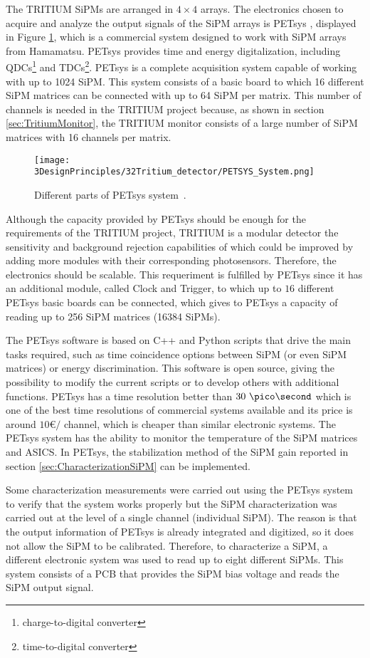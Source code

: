 The TRITIUM SiPMs are arranged in $4\times 4$ arrays. The electronics chosen to acquire and analyze the output signals of the SiPM arrays is PETsys \cite{PETSYS}, displayed in Figure \ref{fig:PETSYS}, which is a commercial system designed to work with SiPM arrays from Hamamatsu. PETsys provides time and energy digitalization, including QDCs\footnote{charge-to-digital converter} and TDCs\footnote{time-to-digital converter}. PETsys is a complete acquisition system capable of working with up to 1024 SiPM. This system consists of a basic board to which 16 different SiPM matrices can be connected with up to 64 SiPM per matrix. This number of channels is needed in the TRITIUM project because, as shown in section \ref{sec:TritiumMonitor}, the TRITIUM monitor consists of a large number of SiPM matrices with 16 channels per matrix.

\begin{figure}[h]
\centering
\texttt{[image: 3DesignPrinciples/32Tritium\_detector/PETSYS\_System.png]}
\caption{Different parts of PETsys system\label{fig:PETSYS}~\cite{PETSYS}.}
\end{figure}
Although the capacity provided by PETsys should be enough for the requirements of the TRITIUM project, TRITIUM is a modular detector the sensitivity and background rejection capabilities of which could be improved by adding more modules with their corresponding photosensors. Therefore, the electronics should be scalable. This requeriment is fulfilled by PETsys since it has an additional module, called Clock and Trigger, to which up to $16$ different PETsys basic boards can be connected, which gives to PETsys a capacity of reading up to 256 SiPM matrices (16384 SiPMs). 

The PETsys software is based on C++ and Python scripts that drive the main tasks required, such as time coincidence options between SiPM (or even SiPM matrices) or energy discrimination. This software is open source, giving the possibility to modify the current scripts or to develop others with additional functions. PETsys has a time resolution better than $30~\pico\second$ which is one of the best time resolutions of commercial systems available and its price is around $10$\euro$/$ channel, which is cheaper than similar electronic systems. The PETsys system has the ability to monitor the temperature of the SiPM matrices and ASICS. In PETsys, the stabilization method of the SiPM gain reported in section \ref{sec:CharacterizationSiPM} can be implemented.

Some characterization measurements were carried out using the PETsys system to verify that the system works properly but the SiPM characterization was carried out at the level of a single channel (individual SiPM). The reason is that the output information of PETsys is already integrated and digitized, so it does not allow the SiPM to be calibrated. Therefore, to characterize a SiPM, a different electronic system was used to read up to eight different SiPMs. This system consists of a PCB that provides the SiPM bias voltage and reads the SiPM output signal. 

